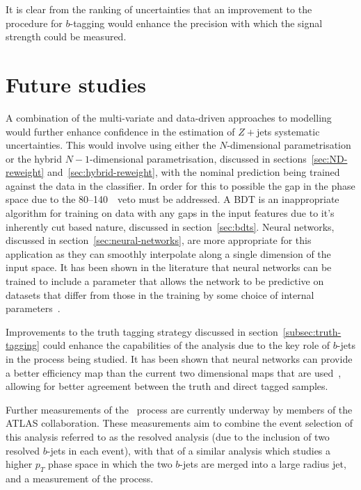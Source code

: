 It is clear from the ranking of uncertainties that an improvement to the
procedure for $b$-tagging would enhance the precision with which the signal
strength could be measured.

\section{Future studies}%
\label{sec:future}

A combination of the multi-variate and data-driven approaches to modelling would
further enhance confidence in the estimation of $Z+$jets systematic
uncertainties. This would involve using either the $N$-dimensional
parametrisation or the hybrid $N-1$-dimensional parametrisation, discussed in
sections~\ref{sec:ND-reweight} and~\ref{sec:hybrid-reweight}, with the nominal
prediction being trained against the data in the classifier. In order for this
to possible the gap in the phase space due to the 80--140~\GeV\ veto must be
addressed. A BDT is an inappropriate algorithm for training on data with any
gaps in the input features due to it's inherently cut based nature, discussed in
section~\ref{sec:bdts}. Neural networks, discussed in
section~\ref{sec:neural-networks}, are more appropriate for this application as
they can smoothly interpolate along a single dimension of the input space. It
has been shown in the literature that neural networks can be trained to include
a parameter that allows the network to be predictive on datasets that differ
from those in the training by some choice of internal
parameters~\cite{param-hep, param-hep-2}.

Improvements to the truth tagging strategy discussed in
section~\ref{subsec:truth-tagging} could enhance the capabilities of the
analysis due to the key role of $b$-jets in the process being studied. It has
been shown that neural networks can provide a better efficiency map than the
current two dimensional maps that are used~\cite{nn-truth-tagging}, allowing for
better agreement between the truth and direct tagged samples.

Further measurements of the \VHbb\ process are currently underway by members of
the ATLAS collaboration. These measurements aim to combine the event selection
of this analysis referred to as the resolved analysis (due to the inclusion of
two resolved $b$-jets in each event), with that of a similar analysis which
studies a higher $p_T$ phase space in which the two $b$-jets are merged into a
large radius jet, and a measurement of the \VHcc process.